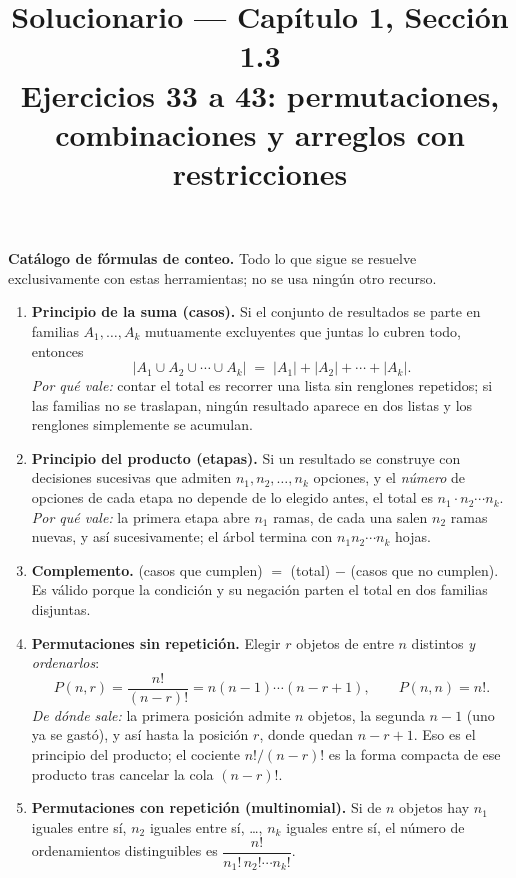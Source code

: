 \documentclass[11pt]{article}
\title{Solucionario --- Cap\'itulo 1, Secci\'on 1.3\\ Ejercicios 33 a 43: permutaciones, combinaciones y arreglos con restricciones}
\author{}
\date{}
\begin{document}
\maketitle

\begin{teo}
\textbf{Cat\'alogo de f\'ormulas de conteo.} Todo lo que sigue se resuelve exclusivamente con estas herramientas; no se usa ning\'un otro recurso.

\begin{enumerate}[leftmargin=*]
  \item \textbf{Principio de la suma (casos).} Si el conjunto de resultados se parte en familias $A_1,\dots,A_k$ mutuamente excluyentes que juntas lo cubren todo, entonces
  \[
    |A_1\cup A_2\cup\cdots\cup A_k| \;=\; |A_1|+|A_2|+\cdots+|A_k| .
  \]
  \emph{Por qu\'e vale:} contar el total es recorrer una lista sin renglones repetidos; si las familias no se traslapan, ning\'un resultado aparece en dos listas y los renglones simplemente se acumulan.

  \item \textbf{Principio del producto (etapas).} Si un resultado se construye con decisiones sucesivas que admiten $n_1, n_2,\dots,n_k$ opciones, y el \emph{n\'umero} de opciones de cada etapa no depende de lo elegido antes, el total es $n_1\cdot n_2\cdots n_k$.
  \emph{Por qu\'e vale:} la primera etapa abre $n_1$ ramas, de cada una salen $n_2$ ramas nuevas, y as\'i sucesivamente; el \'arbol termina con $n_1n_2\cdots n_k$ hojas.

  \item \textbf{Complemento.} (casos que cumplen) $=$ (total) $-$ (casos que no cumplen). Es v\'alido porque la condici\'on y su negaci\'on parten el total en dos familias disjuntas.

  \item \textbf{Permutaciones sin repetici\'on.} Elegir $r$ objetos de entre $n$ distintos \emph{y ordenarlos}:
  \[
    P(n,r)=\frac{n!}{(n-r)!}=n(n-1)\cdots(n-r+1),\qquad P(n,n)=n! .
  \]
  \emph{De d\'onde sale:} la primera posici\'on admite $n$ objetos, la segunda $n-1$ (uno ya se gast\'o), y as\'i hasta la posici\'on $r$, donde quedan $n-r+1$. Eso es el principio del producto; el cociente $n!/(n-r)!$ es la forma compacta de ese producto tras cancelar la cola $(n-r)!$.

  \item \textbf{Permutaciones con repetici\'on (multinomial).} Si de $n$ objetos hay $n_1$ iguales entre s\'i, $n_2$ iguales entre s\'i, \dots, $n_k$ iguales entre s\'i, el n\'umero de ordenamientos distinguibles es $\dfrac{n!}{n_1!\,n_2!\cdots n_k!}$.


\end{enumerate}
\end{teo}
\end{document}
